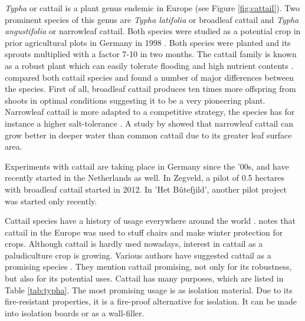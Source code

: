 \documentclass[a4paper,12pt]{scrbook}
\begin{document}
\textit{Typha} or cattail is a plant genus endemic in Europe (see Figure \ref{fig:cattail}). Two prominent species of this genus are \textit{Typha latifolia} or broadleaf cattail and \textit{Typha angustifolia} or narrowleaf cattail. Both species were studied as a potential crop in prior agricultural plots in Germany in 1998 \citep{wild2001cultivation}. Both species were planted and its sprouts multiplied with a factor 7-10 in two months. The cattail family is known as a robust plant which can easily tolerate flooding and high nutrient contents \citep{wild2001cultivation}. \citet{heinz2011population} compared both cattail species and found a number of major differences between the species. First of all, broadleaf cattail produces ten times more offspring from shoots in optimal conditions suggesting it to be a very pioneering plant. Narrowleaf cattail is more adapted to a competitive strategy, the species has for instance a higher salt-tolerance \citep{heinz2011population}. A study by \citet{grace1982niche} showed that narrowleaf cattail can grow better in deeper water than common cattail due to its greater leaf surface area.

Experiments with cattail are taking place in Germany since the '00s, and have recently started in the Netherlands as well. In Zegveld, a pilot of 0.5 hectares with broadleaf cattail started in 2012. In 'Het B\^utefjild', another pilot project was started only recently. 

Cattail species have a history of usage everywhere around the world \citep{morton1975cattails}. \citet{morton1975cattails} notes that cattail in the Europe was used to stuff chairs and make winter protection for crops. Although cattail is hardly used nowadays, interest in cattail as a paludiculture crop is growing. Various authors have suggested cattail as a promising species \citep{morton1975cattails, heinz2011population}. They mention cattail promising, not only for its robustness, but also for its potential uses. Cattail has many purposes, which are listed in Table \ref{tab:typha}. The most promising usage is as isolation material. Due to its fire-resistant properties, it is a fire-proof alternative for isolation. It can be made into isolation boards or as a wall-filler. 

\end{document}
